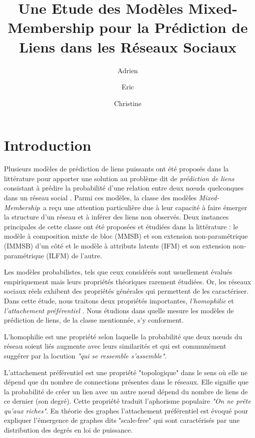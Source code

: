 \documentclass[french]{hermes-journal}
\title[]{Une Etude des Modèles Mixed-Membership pour la Prédiction de Liens dans les Réseaux Sociaux}
\author[1]{Adrien}{Dulac}
\author[1]{Eric}{Gaussier}
\author[2]{Christine}{Largeron}
\newcommand{\mmm}{\textit{Mixed-Membership}~}
\begin{document}
\maketitle

\newpage






\section{Introduction}

\label{sec:intro}

Plusieurs modèles de prédiction de liens puissants ont été proposés dans la littérature pour apporter une solution au problème dit de \textit{prédiction de liens} consistant à prédire la probabilité d'une relation entre deux n\oe{}uds quelconques dans un réseau social \cite{LibenNowell07, HassanZaki11}.
Parmi ces modèles, la classe des modèles \mmm a reçu une attention particulière due à leur capacité à faire émerger la structure d'un réseau et à inférer des liens non observés.
Deux instances principales de cette classe ont été proposées et étudiées  dans la littérature : le modèle à composition mixte de bloc (MMSB) \cite{MMSB} et son extension non-paramétrique (IMMSB) \cite{iMMSB, fan2015dynamic} d'un côté et le modèle à attributs latents (IFM) \cite{BMF} et son extension non-paramétrique (ILFM) \cite{ILFRM} de l'autre. 


Les modèles probabilistes, tels que ceux considérés sont usuellement évalués empiriquement mais leurs propriétés théoriques rarement étudiées. Or, les réseaux sociaux réels exhibent des propriétés générales qui permettent de les caractériser. Dans cette étude, nous traitons deux propriétés importantes, \textit{l'homophilie} et \textit{l'attachement préférentiel} \cite{ Barabasi2003}. Nous étudions dans quelle mesure les modèles de prédiction de liens, de la classe mentionnée, s'y conforment.

L'homophilie est une propriété selon laquelle la probabilité que deux n\oe{}uds du réseau soient liés augmente avec leurs similarités et qui est communément suggérer par la locution \emph{"qui se ressemble s'assemble"}.

L'attachement préférentiel est une propriété "topologique" dans le sens où elle ne dépend que du nombre de connections présentes dans le réseaux. Elle signifie que la probabilité de créer un lien avec un autre n\oe{}ud dépend du nombre de liens de ce dernier (son degré). Cette propriété traduit l'aphorisme populaire \emph{"On ne prête qu'aux riches"}. En théorie des graphes l'attachement préférentiel est évoqué pour expliquer l'émergence de graphes dits "scale-free" qui sont caractérisés par une distribution des degrés en loi de puissance.
\end{document}

